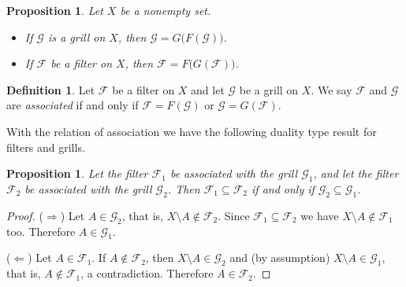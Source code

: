 \documentclass[12pt]{article}
\theoremstyle{plain}
\newtheorem{prop}[thm]{Proposition}
\theoremstyle{definition}
\newtheorem{defn}[thm]{Definition}
\newcommand{\calF}{\mathcal{F}}
\newcommand{\calG}{\mathcal{G}}
\begin{document}
\begin{prop}
  Let $X$ be a nonempty set.
  \begin{itemize}
    \item[(a)] If $\calG$ is a grill on $X$, then $\calG = G\bigl(F(\calG)\bigr)$.
    
    \item[(b)] If $\calF$ be a filter on $X$, then $\calF = F\bigl(G(\calF)\bigr)$.
  \end{itemize}
\end{prop}

\begin{defn}
  Let $\calF$ be a filter on $X$ and let $\calG$ be a grill on $X$.
  We say $\calF$ and $\calG$ are \textsl{associated} if and only if $\calF = F(\calG)$ or $\calG = G(\calF)$. 
\end{defn}

With the relation of association we have the following duality type result for filters and grills.

\begin{prop}
  \label{prop:duality}
  Let the filter $\calF_1$ be associated with the grill $\calG_1$, and let the filter $\calF_2$ be associated with the grill $\calG_2$.
  Then $\calF_1 \subseteq \calF_2$ if and only if $\calG_2 \subseteq \calG_1$.
\end{prop}
\begin{proof}
  ($\Rightarrow$)
  Let $A \in \calG_2$, that is, $X \setminus A \not\in \calF_2$.
  Since $\calF_1 \subseteq \calF_2$ we have $X \setminus A \not\in \calF_1$ too.
  Therefore $A \in \calG_1$.

  ($\Leftarrow$)
  Let $A \in \calF_1$.
  If $A \not\in \calF_2$, then $X \setminus A \in \calG_2$ and (by assumption) $X \setminus A \in \calG_1$, that is, $A \not\in \calF_1$, a contradiction.
  Therefore $A \in \calF_2$.
\end{proof}
\end{document}
